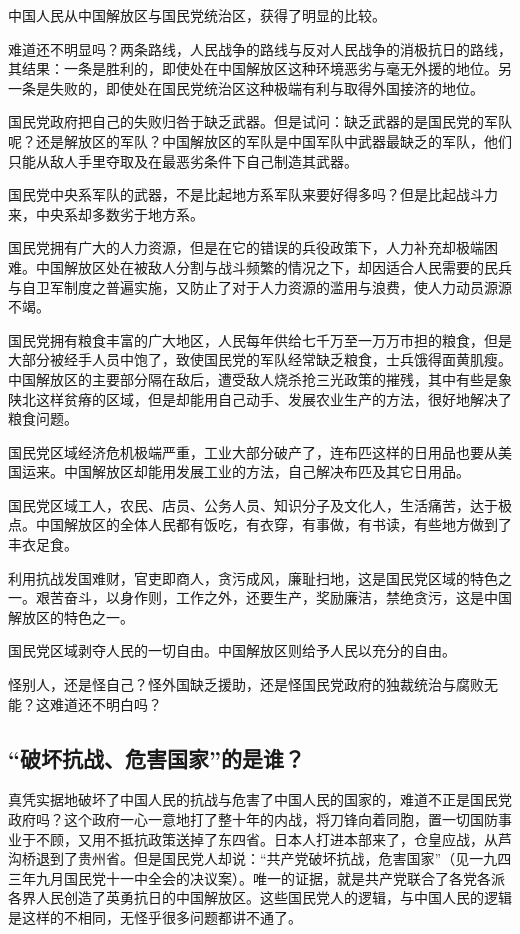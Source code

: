 中国人民从中国解放区与国民党统治区，获得了明显的比较。

难道还不明显吗？两条路线，人民战争的路线与反对人民战争的消极抗日的路线，其结果：一条是胜利的，即使处在中国解放区这种环境恶劣与毫无外援的地位。另一条是失败的，即使处在国民党统治区这种极端有利与取得外国接济的地位。

国民党政府把自己的失败归咎于缺乏武器。但是试问：缺乏武器的是国民党的军队呢？还是解放区的军队？中国解放区的军队是中国军队中武器最缺乏的军队，他们只能从敌人手里夺取及在最恶劣条件下自己制造其武器。

国民党中央系军队的武器，不是比起地方系军队来要好得多吗？但是比起战斗力来，中央系却多数劣于地方系。

国民党拥有广大的人力资源，但是在它的错误的兵役政策下，人力补充却极端困难。中国解放区处在被敌人分割与战斗频繁的情况之下，却因适合人民需要的民兵与自卫军制度之普遍实施，又防止了对于人力资源的滥用与浪费，使人力动员源源不竭。

国民党拥有粮食丰富的广大地区，人民每年供给七千万至一万万市担的粮食，但是大部分被经手人员中饱了，致使国民党的军队经常缺乏粮食，士兵饿得面黄肌瘦。中国解放区的主要部分隔在敌后，遭受敌人烧杀抢三光政策的摧残，其中有些是象陕北这样贫瘠的区域，但是却能用自己动手、发展农业生产的方法，很好地解决了粮食问题。

国民党区域经济危机极端严重，工业大部分破产了，连布匹这样的日用品也要从美国运来。中国解放区却能用发展工业的方法，自己解决布匹及其它日用品。

国民党区域工人，农民、店员、公务人员、知识分子及文化人，生活痛苦，达于极点。中国解放区的全体人民都有饭吃，有衣穿，有事做，有书读，有些地方做到了丰衣足食。

利用抗战发国难财，官吏即商人，贪污成风，廉耻扫地，这是国民党区域的特色之一。艰苦奋斗，以身作则，工作之外，还要生产，奖励廉洁，禁绝贪污，这是中国解放区的特色之一。

国民党区域剥夺人民的一切自由。中国解放区则给予人民以充分的自由。

怪别人，还是怪自己？怪外国缺乏援助，还是怪国民党政府的独裁统治与腐败无能？这难道还不明白吗？

\subsection{“破坏抗战、危害国家”的是谁？}

真凭实据地破坏了中国人民的抗战与危害了中国人民的国家的，难道不正是国民党政府吗？这个政府一心一意地打了整十年的内战，将刀锋向着同胞，置一切国防事业于不顾，又用不抵抗政策送掉了东四省。日本人打进本部来了，仓皇应战，从芦沟桥退到了贵州省。但是国民党人却说：“共产党破坏抗战，危害国家”（见一九四三年九月国民党十一中全会的决议案）。唯一的证据，就是共产党联合了各党各派各界人民创造了英勇抗日的中国解放区。这些国民党人的逻辑，与中国人民的逻辑是这样的不相同，无怪乎很多问题都讲不通了。

